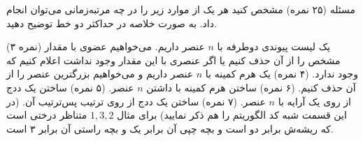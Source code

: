 ‌مسئله
(۲۵ نمره) مشخص کنید هر یک از موارد زیر را در چه مرتبه‌زمانی می‌توان انجام داد. به صورت خلاصه در حداکثر دو خط توضیح دهید.






(۳ نمره) یک لیست پیوندی دوطرفه با $n$ عنصر داریم. می‌خواهیم عضوی با مقدار مشخص را از آن حذف کنیم یا اگر عنصری با این مقدار وجود نداشت اعلام کنیم که وجود ندارد.
(۴ نمره) یک هرم کمینه با $n$ عنصر داریم و می‌خواهیم بزرگترین عنصر را از آن حذف کنیم.
(۶ نمره) ساختن هرم کمینه با داشتن $n$ عنصر.
(۵ نمره) ساختن یک ددج از روی یک آرایه با $n$ عنصر.
(۷ نمره) ساختن یک ددج از روی ترتیب پس‌ترتیب آن. (در این قسمت شبه کد الگوریتم را هم ذکر نمایید) برای مثال 
$1, 3, 2$
متناظر درختی است که ریشه‌ش برابر دو است و بچه چپی آن برابر یک و بچه راستی آن برابر ۳ است.











